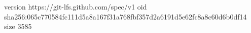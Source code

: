 version https://git-lfs.github.com/spec/v1
oid sha256:065c770584fc111d5a8a167f31a768fbf357d2a6191d5e62fc8a8c60d6b0df14
size 3585

